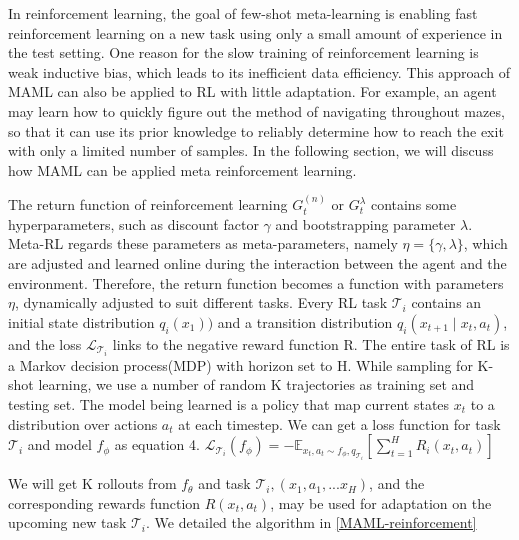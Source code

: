 In reinforcement learning, the goal of few-shot meta-learning is enabling fast reinforcement learning  on a new task using only a small amount of experience in the test setting. One reason for the slow training of reinforcement learning is weak inductive bias, which leads to its inefficient data efficiency. This approach of MAML can also be applied to RL with little adaptation. For example, an agent may learn how to quickly figure out the method of navigating throughout mazes, so that it can use its prior knowledge to reliably determine how to reach the exit with only a limited number of samples. In the following section, we will discuss how MAML can be applied meta reinforcement learning.

The return function of reinforcement learning $G_t^{(n)}$ or $G_t^{\lambda}$ contains some hyperparameters, such as discount factor $\gamma$ and bootstrapping parameter $\lambda$. Meta-RL regards these parameters as meta-parameters, namely $\eta = \{\gamma, \lambda\}$, which are adjusted and learned online during the interaction between the agent and the environment. Therefore, the return function becomes a function with parameters $\eta$, dynamically adjusted to suit different tasks.
Every RL task $\mathcal{T}_i$ contains an initial state distribution $q_i(x_1))$ and a transition distribution  $q_i(x_{t+1} \mid x_t, a_t)$, and the loss $\mathcal{L}_{\mathcal{T}_i}$ links to the negative reward function R. The entire task of RL is a Markov decision process(MDP) with horizon set to H. While sampling for K-shot learning, we use a number of random K trajectories as training set and testing set. The model being learned is a policy that map current states $x_t$ to a distribution over actions $a_t$ at each timestep. We can get a loss function for task $\mathcal{T}_i$ and model $f_\phi$ as equation 4. 
$ \mathcal{L}_{\mathcal{T}_i} (f_\phi) = - \mathbb{E}_{x_t, a_t \sim f_\phi,q_{\mathcal{T}_i}}\left [ \sum_{t=1}^{H} R_i(x_t,a_t)  \right ] $

We will get K rollouts from $f_\theta$ and task $\mathcal{T}_i, (x_1,a_1,...x_H)$, and the corresponding rewards function $R(x_t,a_t)$, may be used for adaptation on the upcoming new task $\mathcal{T}_i$. We detailed the algorithm in \ref{MAML-reinforcement}


